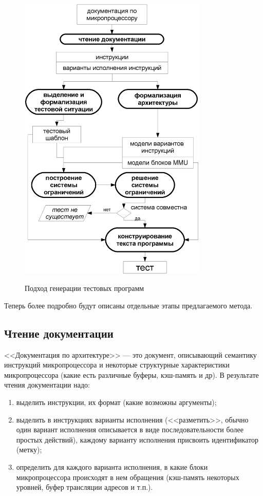  
\begin{figure}[p] \center
  \includegraphics[width=0.8\textwidth]{2.theor/process_manual}\\
  \caption{Подход генерации тестовых программ}\label{fig:process}
\end{figure}

Теперь более подробно будут описаны отдельные этапы предлагаемого метода.

\subsection{Чтение документации}\label{sec:reading_stage}

<<Документация по архитектуре>> --- это документ, описывающий семантику инструкций микропроцессора и некоторые структурные характеристики микропроцессора (какие есть различные буферы, кэш-память и др).
В результате чтения документации надо:
\begin{enumerate}
  \item выделить инструкции, их формат (какие возможны аргументы);
  \item выделить в инструкциях варианты исполнения (<<разметить>>, обычно один вариант исполнения описывается в виде последовательности более простых действий), каждому варианту исполнения присвоить идентификатор (метку);
  \item определить для каждого варианта исполнения, в какие блоки микропроцессора происходят в нем обращения (кэш-память некоторых уровней, буфер трансляции адресов и т.п.).
\end{enumerate}

